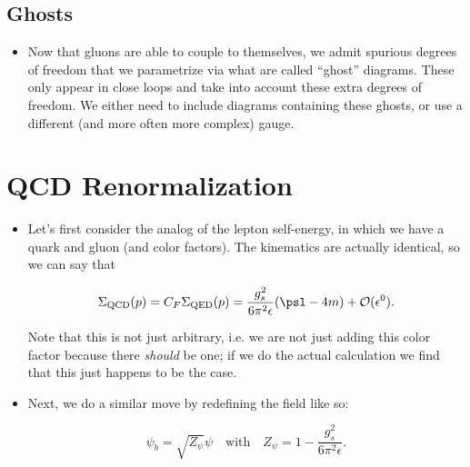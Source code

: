 \subsection{Ghosts}

\begin{itemize}
\item Now that gluons are able to couple to themselves, we admit spurious degrees of freedom that we parametrize via what are called ``ghost'' diagrams. These only appear in close loops and take into account these extra degrees of freedom. We either need to include diagrams containing these ghosts, or use a different (and more often more complex) gauge.
\end{itemize}



\section{QCD Renormalization}

\begin{itemize}
\item Let's first consider the analog of the lepton self-energy, in which we have a quark and gluon (and color factors). The kinematics are actually identical, so we can say that

  \begin{equation}
    \Sigma_{\mathrm{QCD}}(p) = C_F \Sigma_{\mathrm{QED}}(p) = \frac{g_s^2}{6\pi^2\epsilon}(\psl - 4m) + \mathcal{O}(\epsilon^0).
  \end{equation}

  Note that this is not just arbitrary, i.e. we are not just adding this color factor because there \textit{should} be one; if we do the actual calculation we find that this just happens to be the case.

\item Next, we do a similar move by redefining the field like so:

  \begin{equation}
    \psi_b = \sqrt{Z_\psi}\psi \quad\text{with}\quad Z_\psi = 1 - \frac{g_s^2}{6\pi^2\epsilon}.
  \end{equation}

\end{itemize}

